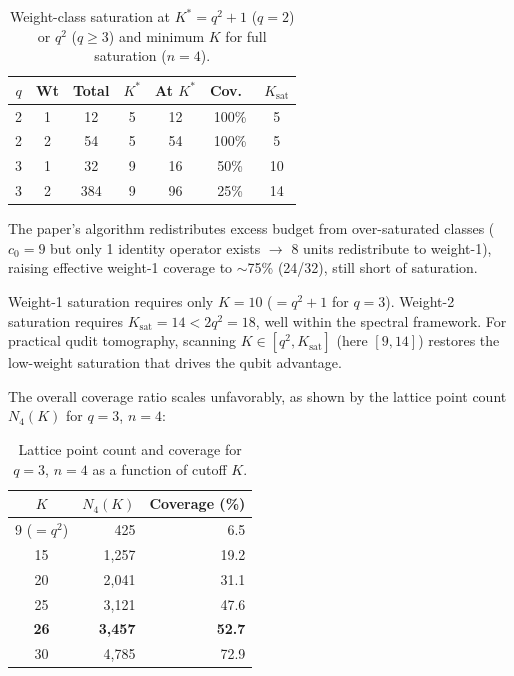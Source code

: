 \documentclass[twocolumn,prx,aps,superscriptaddress,longbibliography]{revtex4-2}
\begin{document}
\begin{table}[ht!]
\caption{Weight-class saturation at $K^* = q^2{+}1$ ($q = 2$) or
$q^2$ ($q \ge 3$) and minimum $K$ for full saturation ($n = 4$).}
\label{tab:saturation}
\begin{ruledtabular}
\begin{tabular}{ccccccc}
$q$ & Wt & Total & $K^*$ & At $K^*$ & Cov.\ & $K_\mathrm{sat}$ \\
\hline
2 & 1 &  12 &  5 &  12 & 100\% & 5 \\
2 & 2 &  54 &  5 &  54 & 100\% & 5 \\
\hline
3 & 1 &  32 &  9 &  16 &  50\% & 10 \\
3 & 2 & 384 &  9 &  96 &  25\% & 14 \\
\end{tabular}
\end{ruledtabular}
\end{table}

The paper's algorithm redistributes excess budget from
over-saturated classes ($c_0 = 9$ but only 1 identity operator
exists $\to$ 8 units redistribute to weight-1), raising effective
weight-1 coverage to $\sim$75\% (24/32), still short of
saturation.

Weight-1 saturation requires only $K = 10$ ($= q^2 + 1$ for $q = 3$).
Weight-2 saturation requires $K_{\mathrm{sat}} = 14 < 2q^2 = 18$, well within
the spectral framework.  For practical qudit tomography, scanning
$K \in [q^2, K_{\mathrm{sat}}]$ (here $[9, 14]$) restores the
low-weight saturation that drives the qubit advantage.

The overall coverage ratio scales unfavorably, as shown by the
lattice point count $N_4(K)$ for $q = 3$, $n = 4$:

\begin{table}[ht!]
\caption{Lattice point count and coverage for $q = 3$, $n = 4$ as
a function of cutoff $K$.}
\label{tab:coverage-scan}
\begin{ruledtabular}
\begin{tabular}{crr}
$K$ & $N_4(K)$ & Coverage (\%) \\
\hline
9 ($= q^2$) & 425 & 6.5 \\
15 & 1{,}257 & 19.2 \\
20 & 2{,}041 & 31.1 \\
25 & 3{,}121 & 47.6 \\
\textbf{26} & \textbf{3{,}457} & \textbf{52.7} \\
30 & 4{,}785 & 72.9 \\
\end{tabular}
\end{ruledtabular}
\end{table}
\end{document}
